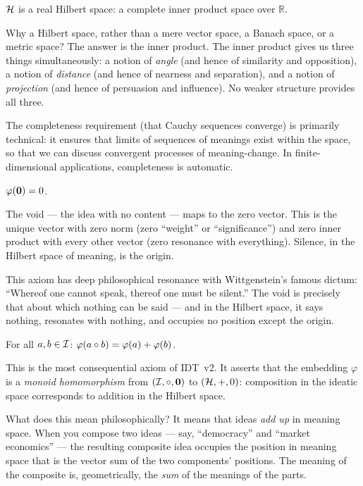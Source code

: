 \begin{axiom}
\label{ax:hilbert}
$\mathcal{H}$ is a real Hilbert space: a complete inner product space over $\mathbb{R}$.
\end{axiom}

Why a Hilbert space, rather than a mere vector space, a Banach space, or a
metric space? The answer is the inner product. The inner product gives us three
things simultaneously: a notion of \emph{angle} (and hence of similarity and
opposition), a notion of \emph{distance} (and hence of nearness and separation),
and a notion of \emph{projection} (and hence of persuasion and influence). No
weaker structure provides all three.

The completeness requirement (that Cauchy sequences converge) is primarily
technical: it ensures that limits of sequences of meanings exist within the
space, so that we can discuss convergent processes of meaning-change. In
finite-dimensional applications, completeness is automatic.

\begin{axiom}
\label{ax:void-embed}
$\varphi(\mathbf{0}) = 0$.
\end{axiom}

The void --- the idea with no content --- maps to the zero vector. This is the
unique vector with zero norm (zero ``weight'' or ``significance'') and zero
inner product with every other vector (zero resonance with everything). Silence,
in the Hilbert space of meaning, is the origin.

This axiom has deep philosophical resonance with Wittgenstein's famous dictum:
``Whereof one cannot speak, thereof one must be silent.'' The void is precisely
that about which nothing can be said --- and in the Hilbert space, it says
nothing, resonates with nothing, and occupies no position except the origin.

\begin{axiom}
\label{ax:compose-add}
For all $a, b \in \mathcal{I}$: $\varphi(a \circ b) = \varphi(a) + \varphi(b)$.
\end{axiom}

This is the most consequential axiom of IDT~v2. It asserts that the embedding
$\varphi$ is a \emph{monoid homomorphism} from $(\mathcal{I}, \circ, \mathbf{0})$ to
$(\mathcal{H}, +, 0)$: composition in the ideatic space corresponds to addition in
the Hilbert space.

What does this mean philosophically? It means that ideas \emph{add up} in
meaning space. When you compose two ideas --- say, ``democracy'' and ``market
economics'' --- the resulting composite idea occupies the position in meaning
space that is the vector sum of the two components' positions. The meaning of
the composite is, geometrically, the \emph{sum} of the meanings of the parts.

